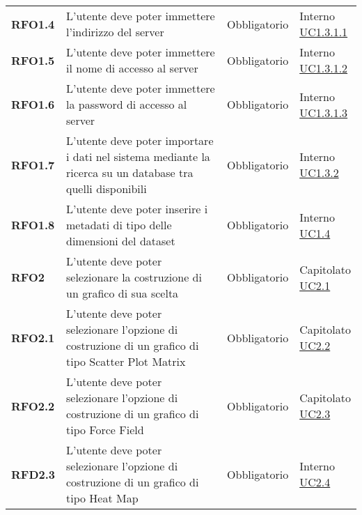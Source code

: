 \begin{longtable}[H]{>{\raggedright\bfseries}m{20mm} >{\raggedright}m{90mm} >{\raggedright}m{28mm} >{\raggedright\arraybackslash}m{30mm}}
    RFO1.4
    &   L'utente deve poter immettere l'indirizzo del server
    & Obbligatorio
    & \makecell{ Interno \\  \hyperref[spar:uc1.3.1.1]{UC1.3.1.1}}\\

    RFO1.5
    &   L'utente deve poter immettere il nome di accesso al server
    & Obbligatorio
    & \makecell{ Interno \\  \hyperref[spar:uc1.3.1.2]{UC1.3.1.2}}\\

    RFO1.6
    &   L'utente deve poter immettere la password di accesso al server
    & Obbligatorio
    & \makecell{ Interno \\  \hyperref[spar:uc1.3.1.3]{UC1.3.1.3}}\\

    RFO1.7
    &   L'utente deve poter importare i dati nel sistema mediante la ricerca
        su un database tra quelli disponibili
    & Obbligatorio
    & \makecell{ Interno \\ \hyperref[par:uc1.3.2]{UC1.3.2}}\\

    RFO1.8
    &   L'utente deve poter inserire i metadati di tipo delle dimensioni del dataset
    & Obbligatorio
    & \makecell{ Interno \\ \hyperref[ssub:uc1.4]{UC1.4}}\\

    RFO2
    & L'utente deve poter selezionare la costruzione di un grafico di sua scelta
    & Obbligatorio
    & \makecell{ Capitolato \\ \hyperref[ssub:uc2.1]{UC2.1}}\\

    RFO2.1
    & L'utente deve poter selezionare l'opzione di costruzione di un grafico di tipo Scatter Plot
    Matrix
    & Obbligatorio
    & \makecell{ Capitolato \\   \hyperref[ssub:uc2.2]{UC2.2}}\\

    RFO2.2
    & L'utente deve poter selezionare l'opzione di costruzione di un grafico di tipo Force Field
    & Obbligatorio
    & \makecell{ Capitolato \\  \hyperref[ssub:uc2.3]{UC2.3}}\\

    RFD2.3
    & L'utente deve poter selezionare l'opzione di costruzione di un grafico di tipo Heat Map
    & Obbligatorio
    & \makecell{ Interno \\  \hyperref[ssub:uc2.4]{UC2.4}}\\


\end{longtable}
